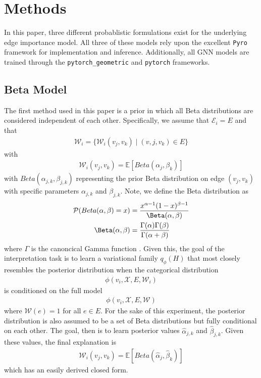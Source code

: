 \section{Methods}
In this paper, three different probablistic formulations exist for the underlying edge importance model. All three of these models rely upon the excellent \verb|Pyro| \cite{bingham_pyro_2018} framework for implementation and inference. Additionally, all GNN models are trained through the \verb|pytorch_geometric| \cite{fey_fast_2019} and \verb|pytorch| \cite{paszke_pytorch_2019} frameworks.

\subsection{Beta Model}
The first method used in this paper is a prior in which all Beta distributions are considered independent of each other. Specifically, we assume that $\mathcal{E}_i = E$ and that
\begin{align*}
	\mathcal{W}_i = \{\mathcal{W}_i(v_j , v_k) \mid (v,j, v_k) \in E\}
\end{align*}
with
\begin{align*}
	\mathcal{W}_i(v_j, v_k) = \mathbb{E}[Beta(\alpha_{j}, \beta_{k})]
\end{align*}
with $Beta(\alpha_{j,k}, \beta_{j, k})$ representing the prior Beta distribution on edge $(v_j, v_k)$ with specific parameters $\alpha_{j,k}$ and $\beta_{j,k}$. Note, we define the Beta distribution as
\begin{align*}
	\mathcal{P}(Beta(\alpha, \beta) = x) &= \frac{x^{\alpha - 1}(1-x)^{\beta - 1}}{\Beta(\alpha, \beta)} \\
	\Beta(\alpha, \beta) &= \frac{\Gamma(\alpha)\Gamma(\beta)}{\Gamma(\alpha + \beta)}
\end{align*}
where $\Gamma$ is the canoncical Gamma function \cite{noauthor_continuous_nodate}. Given this, the goal of the interpretation task is to learn a variational family $q_{\phi}(H)$ that most closely resembles the posterior distribution when the categorical distribution
\begin{align*}
	\phi(v_i, \mathcal{X}, E, \mathcal{W}_i)
\end{align*}
is conditioned on the full model
\begin{align*}
	\phi(v_i, \mathcal{X}, E, \mathcal{W})
\end{align*}
where $\mathcal{W}(e) = 1$ for all $e \in E$. For the sake of this experiment, the posterior distribution is also assumed to be a set of Beta distributions but fully conditional on each other. The goal, then is to learn posterior values $\hat{\alpha}_{j,k}$ and $\hat{\beta}_{j,k}$. Given these values, the final explanation is
\begin{align*}
	\mathcal{W}_i(v_j, v_k) = \mathbb{E}[Beta(\hat{\alpha}_{j}, \hat{\beta}_{k})]
\end{align*}
which has an easily derived closed form.

